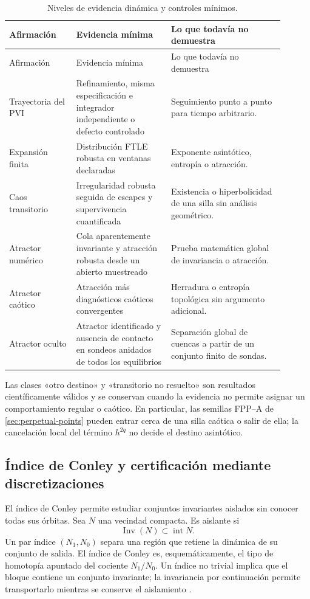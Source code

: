 \begin{longtable}{@{}L{0.22\linewidth}L{0.31\linewidth}L{0.37\linewidth}@{}}
\caption{Niveles de evidencia dinámica y controles mínimos.}
\label{tab:reliability-promotion}\\
\toprule
Afirmación & Evidencia mínima & Lo que todavía no demuestra\\
\midrule
\endfirsthead
\toprule
Afirmación & Evidencia mínima & Lo que todavía no demuestra\\
\midrule
\endhead
Trayectoria del PVI & Refinamiento, misma especificación e integrador independiente
o defecto controlado & Seguimiento punto a punto para tiempo arbitrario.\\
Expansión finita & Distribución FTLE robusta en ventanas declaradas &
Exponente asintótico, entropía o atracción.\\
Caos transitorio & Irregularidad robusta seguida de escapes y supervivencia
cuantificada & Existencia o hiperbolicidad de una silla sin análisis
geométrico.\\
Atractor numérico & Cola aparentemente invariante y atracción robusta desde
un abierto muestreado & Prueba matemática global de invariancia o
atracción.\\
Atractor caótico & Atracción más diagnósticos caóticos convergentes &
Herradura o entropía topológica sin argumento adicional.\\
Atractor oculto & Atractor identificado y ausencia de contacto en sondeos
anidados de todos los equilibrios & Separación global de cuencas a partir de
un conjunto finito de sondas.\\
\bottomrule
\end{longtable}

Las clases «otro destino» y «transitorio no resuelto» son resultados
científicamente válidos y se conservan cuando la evidencia no permite asignar
un comportamiento regular o caótico. En particular, las semillas FPP--A de
\cref{sec:perpetual-points} pueden entrar cerca de una silla caótica o salir
de ella; la cancelación local del término \(h^{2q}\) no decide el destino
asintótico.

\subsection{Índice de Conley y certificación mediante discretizaciones}

El índice de Conley permite estudiar conjuntos invariantes aislados sin
conocer todas sus órbitas. Sea \(N\) una vecindad compacta. Es aislante si
\begin{equation}
 \operatorname{Inv}(N)\subset\operatorname{int}N.
 \label{eq:reliability-isolating-neighborhood}
\end{equation}
Un par índice \((N_1,N_0)\) separa una región que retiene la dinámica de su
conjunto de salida. El índice de Conley es, esquemáticamente, el tipo de
homotopía apuntado del cociente \(N_1/N_0\). Un índice no trivial implica que
el bloque contiene un conjunto invariante; la invariancia por continuación
permite transportarlo mientras se conserve el aislamiento
\cite{Jost2005Dynamical,MischaikowEtAl2016Conley}.

